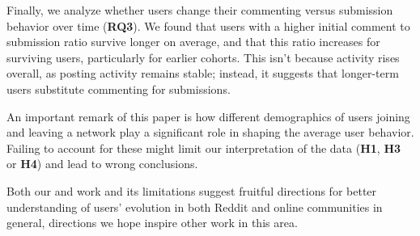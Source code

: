 Finally, we analyze whether users change their commenting versus submission behavior over time (\textbf{RQ3}). 
We found that users with a higher initial comment to submission ratio survive longer on average, and that this ratio increases for surviving users, particularly for earlier cohorts.  This isn't because activity rises overall, as posting activity remains stable; instead, it suggests that longer-term users substitute commenting for submissions. 

An important remark of this paper is how different demographics of users joining and leaving a network play a significant role in shaping the average user behavior. Failing to account for these might limit our interpretation of the data (\textbf{H1}, \textbf{H3} or \textbf{H4}) and lead to wrong conclusions.

Both our and work and its limitations suggest fruitful directions for better understanding of users' evolution in both Reddit and online communities in general, directions we hope inspire other work in this area.  
